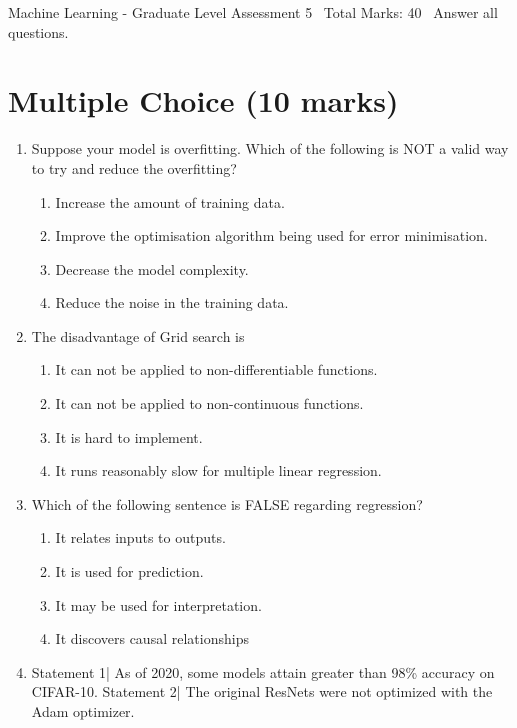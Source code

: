 \documentclass[12pt]{article}
\begin{document}
\begin{center}
Machine Learning - Graduate Level Assessment 5 \
Total Marks: 40 \
Answer all questions.
\end{center}

\section*{Multiple Choice (10 marks)}
\begin{enumerate}[label=\arabic*.]
\item Suppose your model is overfitting. Which of the following is NOT a valid way to try and reduce the overfitting?
\begin{enumerate}[label=(\alph*)]
    \item Increase the amount of training data.
    \item Improve the optimisation algorithm being used for error minimisation.
    \item Decrease the model complexity.
    \item Reduce the noise in the training data.
\end{enumerate}
\item The disadvantage of Grid search is
\begin{enumerate}[label=(\alph*)]
    \item It can not be applied to non-differentiable functions.
    \item It can not be applied to non-continuous functions.
    \item It is hard to implement.
    \item It runs reasonably slow for multiple linear regression.
\end{enumerate}
\item Which of the following sentence is FALSE regarding regression?
\begin{enumerate}[label=(\alph*)]
    \item It relates inputs to outputs.
    \item It is used for prediction.
    \item It may be used for interpretation.
    \item It discovers causal relationships
\end{enumerate}
\item Statement 1| As of 2020, some models attain greater than 98\% accuracy on CIFAR-10. Statement 2| The original ResNets were not optimized with the Adam optimizer.
\begin{enumerate}[label=(\alph*)]

\end{enumerate}
\end{enumerate}
\end{document}
